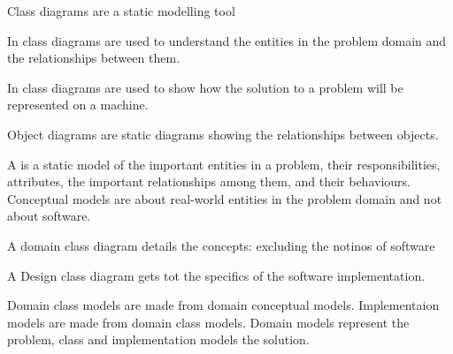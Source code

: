 \begin{compactitem}
\item Class diagrams are a static modelling tool
\item In  class diagrams are used to understand the entities in the problem domain and the relationships between them.
\item In  class diagrams are used to show how the solution to a problem will be represented on a machine. 
\item Object diagrams are static diagrams showing the relationships between objects. 


\item A  is a static model of the important entities in a problem,  their responsibilities, attributes, the important relationships among them,  and their behaviours.
Conceptual models are about real-world entities in the problem domain and not about software.

\item A domain class diagram details the concepts: excluding the notinos of software
\item A Design class diagram gets tot the specifics of the software implementation.
\item Domain class models are made from domain conceptual models. Implementaion models are made from domain class models. Domain models represent the problem, class and implementation models the solution. 
\end{compactitem}












